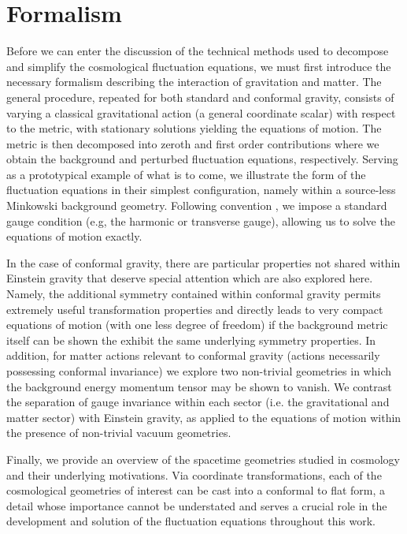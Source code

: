 
\chapter{Formalism}
\label{c:formalism}

Before we can enter the discussion of the technical methods used to decompose and simplify the cosmological fluctuation equations, we must first introduce the necessary formalism describing the interaction of gravitation and matter. The general procedure, repeated for both standard and conformal gravity, consists of varying a classical gravitational action (a general coordinate scalar) with respect to the metric, with stationary solutions yielding the equations of motion. The metric is then decomposed into zeroth and first order contributions where we obtain the background and perturbed fluctuation equations, respectively. Serving as a prototypical example of what is to come, we illustrate the form of the fluctuation equations in their simplest configuration, namely within a source-less Minkowski background geometry. Following convention \cite{weinberg_1972}, we impose a standard gauge condition (e.g, the harmonic or transverse gauge), allowing us to solve the equations of motion exactly.

In the case of conformal gravity, there are particular properties not shared within Einstein gravity \cite{mannheim_2012} that deserve special attention which are also explored here. Namely, the additional symmetry contained within conformal gravity permits extremely useful transformation properties and directly leads to very compact equations of motion (with one less degree of freedom) if the background metric itself can be shown the exhibit the same underlying symmetry properties. In addition, for matter actions relevant to conformal gravity (actions necessarily possessing conformal invariance) we explore two non-trivial geometries \cite{mannheim_kazanas_1988, mannheim_kazanas_1989, mannheim_1990} in which the background energy momentum tensor may be shown to vanish. We contrast the separation of gauge invariance within each sector (i.e. the gravitational and matter sector) with Einstein gravity, as applied to the equations of motion within the presence of non-trivial vacuum geometries.

Finally, we provide an overview of the spacetime geometries studied in cosmology and their underlying motivations. Via coordinate transformations, each of the cosmological geometries of interest can be cast into a conformal to flat form, a detail whose importance cannot be understated and serves a crucial role in the development and solution of the fluctuation equations throughout this work.

